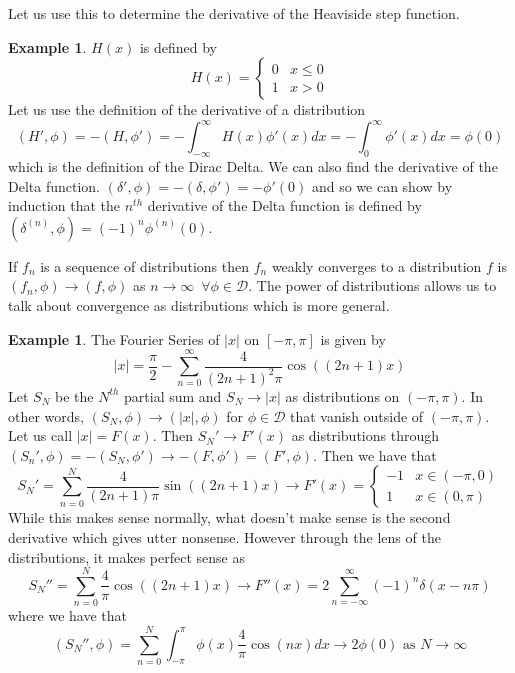 \documentclass{article}
\newcommand{\push}{\,\,\,}
\theoremstyle{definition}
\newtheorem{example}[theorem]{Example}
\begin{document}
Let us use this to determine the derivative of the Heaviside step function.
\begin{example}
    $H(x)$ is defined by 
    \begin{equation*}
        H(x) = \begin{cases}
            0 & x \leq 0 \\ 1 & x>0
        \end{cases}
    \end{equation*}
    Let us use the definition of the derivative of a distribution 
    \begin{equation*}
        (H',\phi) = -(H,\phi') = -\int^\infty_{-\infty} H(x)\phi'(x)dx = -\int^\infty_0 \phi'(x)dx = \phi(0)
    \end{equation*}
    which is the definition of the Dirac Delta. We can also find the derivative of the Delta function. $(\delta ',\phi) = -(\delta, \phi') =-\phi'(0)$ and so we can show by induction that the $n^{th}$ derivative of the Delta function is defined by $(\delta^{(n)},\phi) = (-1)^n\phi^{(n)}(0)$.
\end{example}
If $f_n$ is a sequence of distributions then $f_n$ weakly converges to a distribution $f$ is $(f_n,\phi)\to (f,\phi)$ as $n\to \infty\push\forall \phi \in \mathcal{D}$.
The power of distributions allows us to talk about convergence as distributions which is more general. 
\begin{example}
    The Fourier Series of $|x|$ on $[-\pi,\pi]$ is given by 
    \begin{equation*}
        |x| = \frac{\pi}{2} -\sum^\infty_{n=0} \frac{4}{(2n+1)^2 \pi} \cos((2n+1)x)
    \end{equation*}
    Let $S_N$ be the $N^{th}$ partial sum and $S_N \to |x|$ as distributions on $(-\pi,\pi)$. In other words, $(S_N, \phi) \to (|x|,\phi)$ for $\phi \in \mathcal{D}$ that vanish outside of $(-\pi,\pi)$. Let us call $|x| = F(x)$. Then $S_N' \to F'(x)$ as distributions through $(S_n', \phi) = - (S_N,\phi') \to -(F,\phi')=(F',\phi)$. Then we have that 
    \begin{equation*}
        S_N' = \sum ^N_{n=0} \frac{4}{(2n+1)\pi} \sin((2n+1)x)  \to F'(x) = \begin{cases}
            -1 & x\in (-\pi,0) \\
            1 & x\in (0,\pi)
        \end{cases}
    \end{equation*}
    While this makes sense normally, what doesn't make sense is the second derivative which gives utter nonsense. However through the lens of the distributions, it makes perfect sense as 
    \begin{equation*}
        S_N'' = \sum^N_{n=0} \frac{4}{\pi}\cos((2n+1)x) \to F''(x) = 2 \sum^\infty_{n=-\infty} (-1)^n \delta (x-n\pi)
    \end{equation*}
    where we have that 
    \begin{equation*}
        (S_N'',\phi) = \sum^N_{n=0} \int^\pi_{-\pi} \phi(x) \frac{4}{\pi}\cos(nx)dx \to 2\phi(0) \text{ as } N \to \infty
    \end{equation*}
\end{example}
\end{document}
